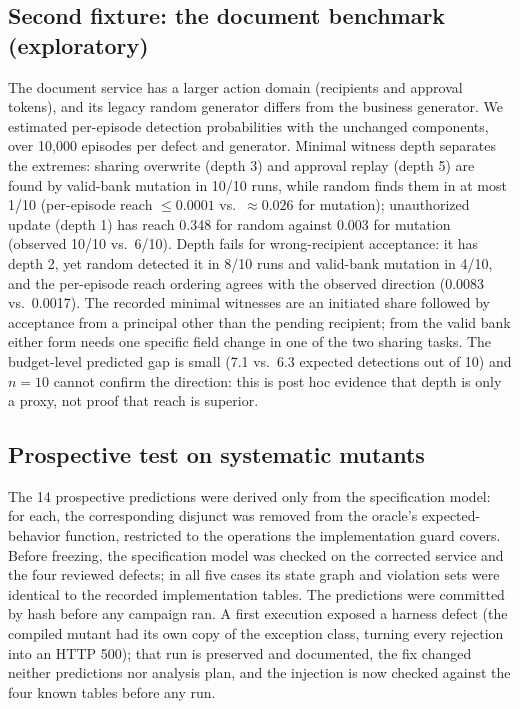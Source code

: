 \documentclass[conference]{IEEEtran}
\begin{document}
\subsection{Second fixture: the document benchmark (exploratory)}
The document service has a larger action domain (recipients and approval tokens), and its
legacy random generator differs from the business generator. We estimated per-episode
detection probabilities with the unchanged components, over 10{,}000 episodes per defect
and generator. Minimal witness depth separates the extremes: sharing overwrite (depth 3)
and approval replay (depth 5) are found by valid-bank mutation in 10/10 runs, while random
finds them in at most 1/10 (per-episode reach $\le0.0001$ vs.\ $\approx0.026$ for
mutation); unauthorized update (depth 1) has reach 0.348 for random against 0.003 for
mutation (observed 10/10 vs.\ 6/10). Depth fails for wrong-recipient acceptance: it has
depth 2, yet random detected it in 8/10 runs and valid-bank mutation in 4/10, and the
per-episode reach ordering agrees with the observed direction (0.0083 vs.\ 0.0017). The
recorded minimal witnesses are an initiated share followed by acceptance from a principal
other than the pending recipient; from the valid bank either form needs one specific field
change in one of the two sharing tasks. The budget-level predicted gap is small (7.1 vs.\
6.3 expected detections out of 10) and $n=10$ cannot confirm the direction: this is post
hoc evidence that depth is only a proxy, not proof that reach is superior.

\subsection{Prospective test on systematic mutants}
The 14 prospective predictions were derived only from the specification model: for each,
the corresponding disjunct was removed from the oracle's expected-behavior function,
restricted to the operations the implementation guard covers. Before freezing, the
specification model was checked on the corrected service and the four reviewed defects; in
all five cases its state graph and violation sets were identical to the recorded
implementation tables. The predictions were committed by hash before any campaign ran. A
first execution exposed a harness defect (the compiled mutant had its own copy of the
exception class, turning every rejection into an HTTP 500); that run is preserved and
documented, the fix changed neither predictions nor analysis plan, and the injection is
now checked against the four known tables before any run.
\end{document}
